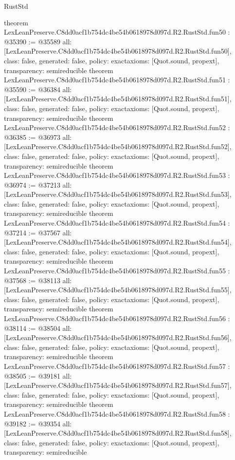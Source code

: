 \begin{lexlean}{RustStd}
\begin{coremodule}
{}
theorem LexLeanPreserve.C8dd0acf1b754dc4be54b0618978d097d.R2.RustStd.fun50 : @35390 := @35589 {
  all: [LexLeanPreserve.C8dd0acf1b754dc4be54b0618978d097d.R2.RustStd.fun50],
  class: false,
  generated: false,
  policy: exact{axioms: [Quot.sound, propext]},
  transparency: semireducible
}
theorem LexLeanPreserve.C8dd0acf1b754dc4be54b0618978d097d.R2.RustStd.fun51 : @35590 := @36384 {
  all: [LexLeanPreserve.C8dd0acf1b754dc4be54b0618978d097d.R2.RustStd.fun51],
  class: false,
  generated: false,
  policy: exact{axioms: [Quot.sound, propext]},
  transparency: semireducible
}
theorem LexLeanPreserve.C8dd0acf1b754dc4be54b0618978d097d.R2.RustStd.fun52 : @36385 := @36973 {
  all: [LexLeanPreserve.C8dd0acf1b754dc4be54b0618978d097d.R2.RustStd.fun52],
  class: false,
  generated: false,
  policy: exact{axioms: [Quot.sound, propext]},
  transparency: semireducible
}
theorem LexLeanPreserve.C8dd0acf1b754dc4be54b0618978d097d.R2.RustStd.fun53 : @36974 := @37213 {
  all: [LexLeanPreserve.C8dd0acf1b754dc4be54b0618978d097d.R2.RustStd.fun53],
  class: false,
  generated: false,
  policy: exact{axioms: [Quot.sound, propext]},
  transparency: semireducible
}
theorem LexLeanPreserve.C8dd0acf1b754dc4be54b0618978d097d.R2.RustStd.fun54 : @37214 := @37567 {
  all: [LexLeanPreserve.C8dd0acf1b754dc4be54b0618978d097d.R2.RustStd.fun54],
  class: false,
  generated: false,
  policy: exact{axioms: [Quot.sound, propext]},
  transparency: semireducible
}
theorem LexLeanPreserve.C8dd0acf1b754dc4be54b0618978d097d.R2.RustStd.fun55 : @37568 := @38113 {
  all: [LexLeanPreserve.C8dd0acf1b754dc4be54b0618978d097d.R2.RustStd.fun55],
  class: false,
  generated: false,
  policy: exact{axioms: [Quot.sound, propext]},
  transparency: semireducible
}
theorem LexLeanPreserve.C8dd0acf1b754dc4be54b0618978d097d.R2.RustStd.fun56 : @38114 := @38504 {
  all: [LexLeanPreserve.C8dd0acf1b754dc4be54b0618978d097d.R2.RustStd.fun56],
  class: false,
  generated: false,
  policy: exact{axioms: [Quot.sound, propext]},
  transparency: semireducible
}
theorem LexLeanPreserve.C8dd0acf1b754dc4be54b0618978d097d.R2.RustStd.fun57 : @38505 := @39181 {
  all: [LexLeanPreserve.C8dd0acf1b754dc4be54b0618978d097d.R2.RustStd.fun57],
  class: false,
  generated: false,
  policy: exact{axioms: [Quot.sound, propext]},
  transparency: semireducible
}
theorem LexLeanPreserve.C8dd0acf1b754dc4be54b0618978d097d.R2.RustStd.fun58 : @39182 := @39354 {
  all: [LexLeanPreserve.C8dd0acf1b754dc4be54b0618978d097d.R2.RustStd.fun58],
  class: false,
  generated: false,
  policy: exact{axioms: [Quot.sound, propext]},
  transparency: semireducible
}
\end{coremodule}
\end{lexlean}

